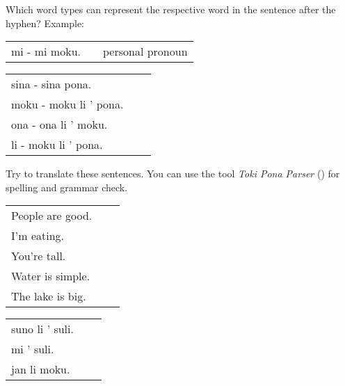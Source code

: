Which word types can represent the respective word in the sentence after the hyphen?
Example:

\begin{supertabular}{p{5,5cm}|ll}
mi - mi moku. && personal pronoun \\ %
\end{supertabular}

\begin{supertabular}{p{5,5cm}|ll}
sina - sina pona. &&  \\ %
moku - moku li ' pona. &&  \\ %
ona - ona li ' moku. &&  \\ %
li - moku li ' pona. &&  \\ %
\end{supertabular}

Try to translate these sentences. 
You can use the tool \textit{Toki Pona Parser} (\cite{www:rowa:02}) for spelling and grammar check. 

\begin{supertabular}{p{5,5cm}|ll}
People are good. && \\ %
I'm eating. &&  \\ %
You're tall. &&  \\ %
Water is simple. &&  \\ %
The lake is big. &&\\ %
\end{supertabular}

\begin{supertabular}{p{5,5cm}|ll}
suno li ' suli. &&  \\%
mi ' suli. &&  \\%
jan li moku. &&  \\%
\end{supertabular} \\%
%
